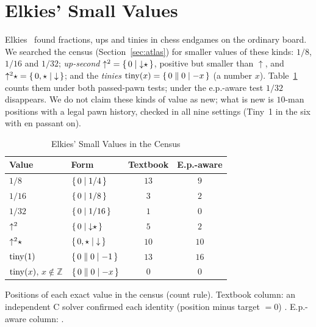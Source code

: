 \section{Elkies' Small Values}\label{sec:targets}

Elkies~\cite{Elkies1996} found fractions, ups and tinies in chess endgames on the ordinary board. We searched
the census (Section~\ref{sec:atlas}) for smaller values of these kinds: $1/8$, $1/16$ and $1/32$;
\emph{up-second} $\mathord{\uparrow^{2}}=\{\,0 \mid {\downarrow}\star\,\}$, positive but smaller than ${\uparrow}$, and
$\mathord{\uparrow^{2}}\star=\{\,0,\star \mid {\downarrow}\,\}$; and the \emph{tinies} $\operatorname{tiny}(x)=\{\,0 \parallel 0\mid -x\,\}$ (a number $x$).
Table~\ref{tab:targets} counts them under both passed-pawn tests; under the e.p.-aware test $1/32$
disappears. We do not claim these kinds of value as new; what is new is $10$-man positions with a legal pawn
history, checked in all nine settings (Tiny~1 in the six with en passant on).

\begin{table}[!t]
\caption{Elkies' Small Values in the Census}
\label{tab:targets}
\centering
\begin{tabular}{@{}llcc@{}}
\toprule
Value & Form & Textbook & E.p.-aware \\
\midrule
$1/8$ & $\{\,0 \mid 1/4\,\}$ & $13$ & $9$ \\
$1/16$ & $\{\,0 \mid 1/8\,\}$ & $3$ & $2$ \\
$1/32$ & $\{\,0 \mid 1/16\,\}$ & $1$ & $0$ \\
$\mathord{\uparrow^{2}}$ & $\{\,0 \mid {\downarrow}\star\,\}$ & $5$ & $2$ \\
$\mathord{\uparrow^{2}}\star$ & $\{\,0,\star \mid {\downarrow}\,\}$ & $10$ & $10$ \\
$\operatorname{tiny}(1)$ & $\{\,0 \parallel 0\mid -1\,\}$ & $13$ & $16$ \\
$\operatorname{tiny}(x)$, $x\notin\mathbb{Z}$ & $\{\,0 \parallel 0\mid -x\,\}$ & $0$ & $0$ \\
\bottomrule
\end{tabular}

\smallskip
\parbox{\columnwidth}{\footnotesize Positions of each exact value in the census (count rule). Textbook
column: an independent C solver confirmed each identity (position minus target $=0$) . E.p.-aware
column: .}
\end{table}

